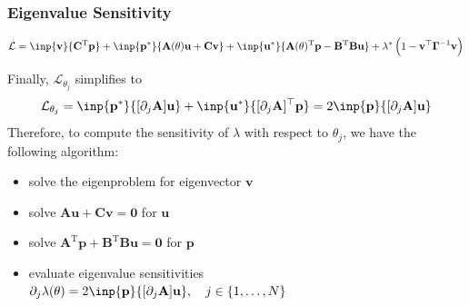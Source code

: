 \documentclass[
  pdf,
  10pt,
  xcolor={svgnames},
]{beamer}
\newcommand{\mbf}[1]{\mathbf{#1}}
\newcommand{\mc}[1]{\mathcal{#1}}
\newcommand{\T}{\mathrm{T}}
\newcommand{\mat}[1]{\mathbf{{#1}}}
\begin{document}
\begin{frame}
  \frametitle{Eigenvalue Sensitivity}
  \begin{block}{}
    \begin{equation*}
      \mc{L}
      = \inp{\mbf{v}}{\mat{C}^\T \mbf{p}}
      + \inp{\mbf{p}^*}{\mat{A}(\theta)\mbf{u} + \mat{C} \mbf{v}}
      + \inp{\mbf{u}^*}{
        \mat{A}(\theta)^\T \mbf{p} - \mat{B}^\T \mat{B} \mbf{u}
      }
      + \lambda^* \left( 1-\mbf{v}^\top \mat{\Gamma}^{-1} \mbf{v} \right)
    \end{equation*}
  \end{block}
  Finally, $\mc{L}_{\theta_j}$ simplifies to
  \begin{equation*}
    \mc{L}_{\theta_j} =
    \inp{\mbf{p}^*}{[\partial_j\mat{A}] \mbf{u}}
    + \inp{\mbf{u}^*}{[\partial_j\mat{A}]^\top \mbf{p}}
    =
    2\inp{\mbf p}{[\partial_j\mat{A}] \mbf{u}}
  \end{equation*}
  \pause
  Therefore, to compute the sensitivity of $\lambda$ with respect to $\theta_j$,
  we have the following algorithm:
  \begin{itemize}[<+->]
    \item solve the eigenproblem for eigenvector $\mbf{v}$
    \item solve $\mat{A} \mbf{u} + \mat{C} \mbf{v} = \mbf{0}$ for $\mbf{u}$
    \item solve $\mat{A}^\T \mbf{p} + \mat{B}^\T\mat{B}\mbf{u} = \mbf{0}$ for
          $\mbf{p}$
    \item evaluate eigenvalue sensitivities \(
          \partial_j \lambda(\mbf\theta)
          = 2\inp{\mbf p}{[\partial_j\mat{A}] \mbf{u}},
          \quad j \in \{1, \ldots, N\}
          \)
  \end{itemize}
\end{frame}
\end{document}
